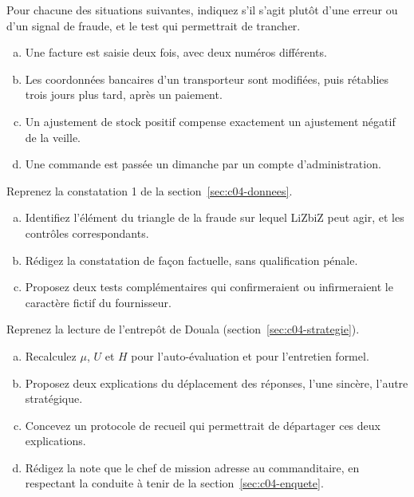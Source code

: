 \bigskip

\begin{boxexo}[title={\ding{45}\quad Exercice~4.1. Erreur ou fraude~? \niveaubase}]
Pour chacune des situations suivantes, indiquez s'il s'agit plutôt d'une
erreur ou d'un signal de fraude, et le test qui permettrait de trancher.
\begin{enumerate}[(a)]
    \item Une facture est saisie deux fois, avec deux numéros différents.
    \item Les coordonnées bancaires d'un transporteur sont modifiées, puis
          rétablies trois jours plus tard, après un paiement.
    \item Un ajustement de stock positif compense exactement un ajustement
          négatif de la veille.
    \item Une commande est passée un dimanche par un compte d'administration.
\end{enumerate}
\end{boxexo}

\begin{boxexo}[title={\ding{45}\quad Exercice~4.2. Le triangle de TRANSLOG SERVICES \niveaumoyen}]
Reprenez la constatation 1 de la section~\ref{sec:c04-donnees}.
\begin{enumerate}[(a)]
    \item Identifiez l'élément du triangle de la fraude sur lequel LiZbiZ peut
          agir, et les contrôles correspondants.
    \item Rédigez la constatation de façon factuelle, sans qualification
          pénale.
    \item Proposez deux tests complémentaires qui confirmeraient ou
          infirmeraient le caractère fictif du fournisseur.
\end{enumerate}
\end{boxexo}

\begin{boxexo}[title={\ding{45}\quad Exercice~4.3. Un usage stratégique de NEK~? \niveauexpert}]
Reprenez la lecture de l'entrepôt de Douala (section~\ref{sec:c04-strategie}).
\begin{enumerate}[(a)]
    \item Recalculez $\mu$, $U$ et $H$ pour l'auto-évaluation et pour
          l'entretien formel.
    \item Proposez deux explications du déplacement des réponses, l'une
          sincère, l'autre stratégique.
    \item Concevez un protocole de recueil qui permettrait de départager ces
          deux explications.
    \item Rédigez la note que le chef de mission adresse au commanditaire, en
          respectant la conduite à tenir de la section~\ref{sec:c04-enquete}.
\end{enumerate}
\end{boxexo}

